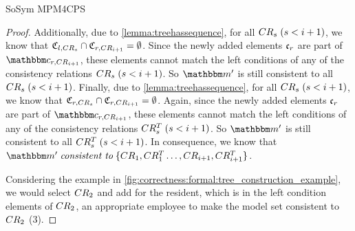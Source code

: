 \begin{copiedFrom}{SoSym MPM4CPS}
\begin{proof}
    Additionally, due to \autoref{lemma:treehassequence}, for all  $CR_{s}\; (s < i+1)$, we know that $\mathfrak{C}_{l,CR_{s}} \cap \mathfrak{C}_{r,CR_{i+1}} = \emptyset$. 
    Since the newly added elements $\mathfrak{c}_{r}$ are part of $\condition{c}{r,\consistencyrelation{CR}{i+1}}$, these elements cannot match the left conditions of any of the consistency relations $CR_{s}\; (s < i+1)$.
    So $\modelset{m'}$ is still consistent to all $CR_{s}\; (s < i+1)$.
    Finally, due to \autoref{lemma:treehassequence}, for all  $CR_{s}\; (s < i+1)$, we know that $\mathfrak{C}_{r,CR_{s}} \cap \mathfrak{C}_{r,CR_{i+1}} = \emptyset$.
    Again, since the newly added elements $\mathfrak{c}_{r}$ are part of $\condition{c}{r,\consistencyrelation{CR}{i+1}}$, these elements cannot match the left conditions of any of the consistency relations $CR^T_{s}\; (s < i+1)$.
    So $\modelset{m'}$ is still consistent to all $CR^T_{s}\; (s < i+1)$.
    In consequence, we know that $\modelset{m'} \consistenttomath \setted{\consistencyrelation{CR}{1}, \consistencyrelation{CR^T}{1} \dots, \consistencyrelation{CR}{i+1}, \consistencyrelation{CR^T}{i+1}}$.
    
    Considering the example in \autoref{fig:correctness:formal:tree_construction_example}, we would select $CR_{2}$ and add for the resident, which is in the left condition elements of $CR_{2}$, an appropriate employee to make the model set consistent to $CR_{2}$ (3).
    

\end{proof}
\end{copiedFrom}
